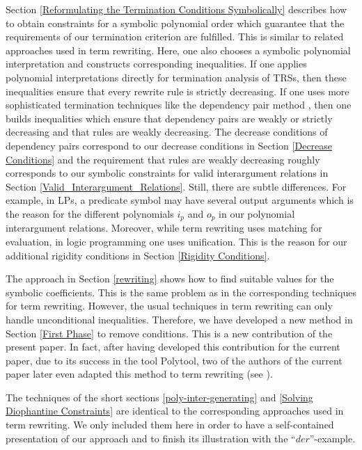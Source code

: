 \documentclass[envcountsame]{tlp}
\newcounter{ex:der-lastsymconsctr}
\begin{document}
Section \ref{Reformulating 
the Termination Conditions Symbolically} describes how to obtain constraints for a
symbolic polynomial order which guarantee that the requirements
of our termination criterion are fulfilled. This is similar
to related approaches used in term rewriting. Here, one also chooses
a symbolic polynomial interpretation and constructs
corresponding inequalities.
If one applies polynomial interpretations
directly for termination analysis of TRSs, then these
inequalities ensure that every rewrite rule is strictly decreasing.
If one uses more sophisticated termination techniques like the
dependency pair method \cite{ArtsGiesl00,JAR07,Hirokawa_Middeldorp04}, then one
builds inequalities which ensure 
that dependency pairs are weakly or strictly decreasing and that
rules are weakly decreasing. The decrease conditions of
dependency pairs correspond to our decrease conditions in Section \ref{Decrease Conditions}
and the requirement that rules are weakly decreasing roughly
corresponds to our symbolic constraints for valid interargument
relations in Section \ref{Valid_Interargument_Relations}. Still, there are
subtle
differences. For example, in
LPs, a predicate symbol may have several output arguments which is the
reason for the different polynomials $i_p$ and $o_p$ in our polynomial
interargument relations. Moreover, while term rewriting uses matching
for evaluation, in logic programming one uses unification. This is the
reason for our additional rigidity conditions in Section \ref{Rigidity Conditions}.

The approach in Section \ref{rewriting} shows how to find suitable values for
the symbolic coefficients. This is the same problem as in
the corresponding techniques for term rewriting. However, the
usual techniques in term rewriting can only handle unconditional
inequalities. Therefore, we have developed a new method in Section \ref{First Phase}
to remove conditions. This is a new contribution of the present paper.
In fact, after having developed this contribution for the current paper, due
to its success in the tool \textsf{Polytool}, two of the authors
of the current paper later even adapted this method to term rewriting (see
\cite[Footnote 14]{MAXPOLO}). 

The techniques of the short sections \ref{poly-inter-generating} and \ref{Solving Diophantine
Constraints}
are identical to the corresponding approaches 
used in term rewriting. We only included them here in order
to have a self-contained presentation of our approach
and to finish its illustration with the ``$\mathit{der}$''-example.
\end{document}
